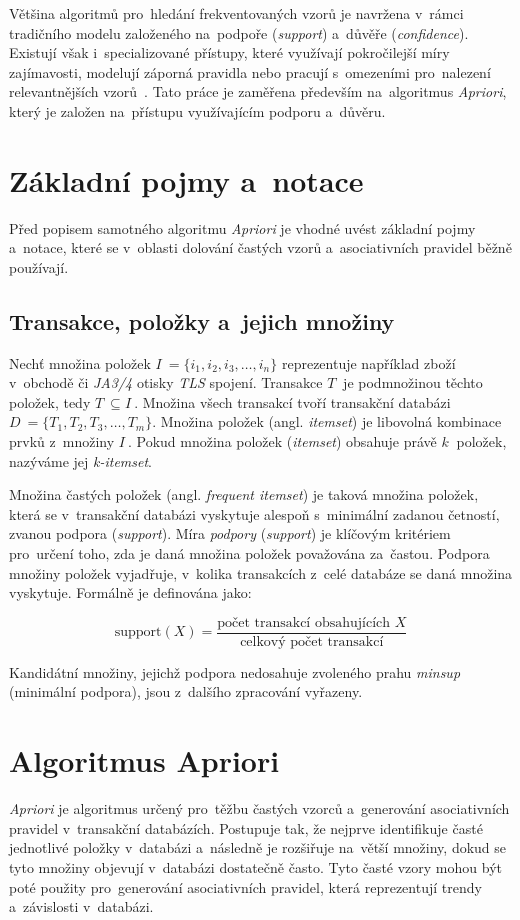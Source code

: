 Většina algoritmů pro~hledání frekventovaných vzorů je navržena v~rámci tradičního modelu založeného na~podpoře (\textit{support}) a~důvěře (\textit{confidence}). Existují však i~specializované přístupy, které využívají pokročilejší míry zajímavosti, modelují záporná pravidla nebo pracují s~omezeními pro~nalezení relevantnějších vzorů~\cite{Aggarwal2014}. Tato práce je zaměřena především na~algoritmus \textit{Apriori}, který je založen na~přístupu využívajícím podporu a~důvěru.

\section{Základní pojmy a~notace}
Před popisem samotného algoritmu \textit{Apriori} je vhodné uvést základní pojmy a~notace, které se v~oblasti dolování častých vzorů a~asociativních pravidel běžně používají.

\subsection{Transakce, položky a~jejich množiny}
Nechť množina položek \( I~= \{i_1, i_2, i_3, \dots, i_n\} \) reprezentuje například zboží v~obchodě či \textit{JA3/4} otisky \textit{TLS} spojení. Transakce \( T~\) je podmnožinou těchto položek, tedy \( T~\subseteq I~\). Množina všech transakcí tvoří transakční databázi \( D~= \{ T_1, T_2, T_3, \dots, T_m \} \). Množina položek (angl. \textit{itemset}) je libovolná kombinace prvků z~množiny \( I~\). Pokud množina položek (\textit{itemset}) obsahuje právě \( k~\) položek, nazýváme jej \textit{k-itemset}.

Množina častých položek (angl. \textit{frequent itemset}) je taková množina položek, která se v~transakční databázi vyskytuje alespoň s~minimální zadanou četností, zvanou podpora (\textit{support}). Míra \textit{podpory} (\textit{support}) je klíčovým kritériem pro~určení toho, zda je daná množina položek považována za~častou. 
Podpora množiny položek vyjadřuje, v~kolika transakcích z~celé databáze se daná množina vyskytuje. 
Formálně je definována jako:

\[
\text{support}(X) = \frac{\text{počet transakcí obsahujících } X}{\text{celkový počet transakcí}}
\]

Kandidátní množiny, jejichž podpora nedosahuje zvoleného prahu \textit{minsup} (minimální podpora), jsou z~dalšího zpracování vyřazeny.


\section{Algoritmus Apriori}
\textit{Apriori} je algoritmus určený pro~těžbu častých vzorců a~generování asociativních pravidel v~transakční databázích. Postupuje tak, že nejprve identifikuje časté jednotlivé položky v~databázi a~následně je rozšiřuje na~větší množiny, dokud se tyto množiny objevují v~databázi dostatečně často. Tyto časté vzory mohou být poté použity pro~generování asociativních pravidel, která reprezentují trendy a~závislosti v~databázi.

